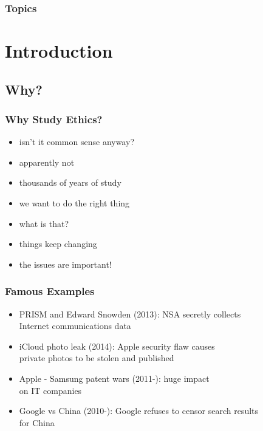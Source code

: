 \documentclass[dvipsnames]{beamer}
\begin{document}
\begin{frame}
  \frametitle{Topics}
  \tableofcontents
\end{frame}

\section{Introduction}

\subsection{Why?}

\begin{frame}
  \frametitle{Why Study Ethics?}

  \begin{itemize}
    \item isn't it common sense anyway?
    \pause
    \item apparently not

    \pause
    \medskip
    \item thousands of years of study

    \pause
    \medskip
    \item we want to do the right thing
    \item what is that?

    \pause
    \medskip
    \item things keep changing

    \pause
    \bigskip
    \item \alert{the issues are important!}
  \end{itemize}
\end{frame}

\begin{frame}
  \frametitle{Famous Examples}

  \begin{itemize}
    \item PRISM and Edward Snowden (2013): NSA secretly collects\\
      Internet communications data

    \medskip
    \item iCloud photo leak (2014): Apple security flaw causes\\
      private photos to be stolen and published

    \medskip
    \item Apple - Samsung patent wars (2011-): huge impact\\
      on IT companies

    \medskip
    \item Google vs China (2010-): Google refuses to censor search results\\
      for China
  \end{itemize}
\end{frame}
\end{document}

